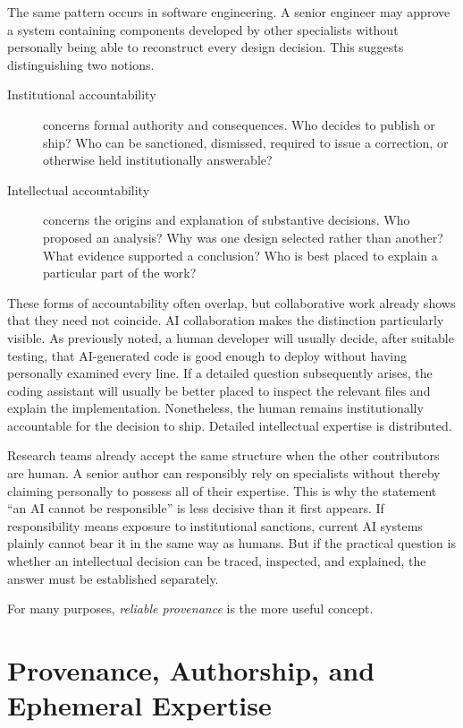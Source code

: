 \documentclass[12pt]{article}
\begin{document}
The same pattern occurs in software engineering. A senior engineer may approve a system containing components developed by other specialists without personally being able to reconstruct every design decision.
This suggests distinguishing two notions.
\begin{description}
    \item[Institutional accountability] concerns formal authority and consequences. Who decides to publish or ship? Who can be sanctioned, dismissed, required to issue a correction, or otherwise held institutionally answerable?
    \item[Intellectual accountability] concerns the origins and explanation of substantive decisions. Who proposed an analysis? Why was one design selected rather than another? What evidence supported a conclusion? Who is best placed to explain a particular part of the work?
\end{description}
These forms of accountability often overlap, but collaborative work already shows that they need not coincide.
AI collaboration makes the distinction particularly visible. As previously noted, a human developer will usually decide, after suitable testing, that AI-generated code is good enough to deploy without having personally examined every line. 
If a detailed question subsequently arises, the coding assistant will usually be better placed to inspect the relevant files and explain the implementation.
Nonetheless, the human remains institutionally accountable for the decision to ship. Detailed intellectual expertise is distributed.

Research teams already accept the same structure when the other contributors are human. A senior author can responsibly rely on specialists without thereby claiming personally to possess all of their expertise.
This is why the statement ``an AI cannot be responsible'' is less decisive than it first appears. If responsibility means exposure to institutional sanctions, current AI systems plainly cannot bear it in the same way as humans. But if the practical question is whether an intellectual decision can be traced, inspected, and explained, the answer must be established separately.

For many purposes, \emph{reliable provenance} is the more useful concept.


\section{Provenance, Authorship, and Ephemeral Expertise}
\end{document}
